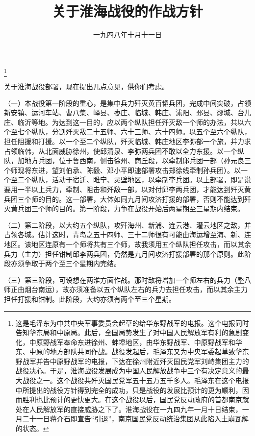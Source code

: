 
\title{关于淮海战役的作战方针}
\date{一九四八年十月十一日}
\thanks{这是毛泽东为中共中央军事委员会起草的给华东野战军的电报。这个电报同时告知华东局和中原局。此后，全国局势发生了对中国人民解放军有利的急剧变化，中原野战军奉命东进徐州、蚌埠地区，由华东野战军、中原野战军和华东、中原的地方部队共同作战。战役发起后，毛泽东又为中央军委起草致华东野战军并告中原野战军的电报，下达在徐州附近歼灭国民党军刘峙集团主力的战役决心。于是，淮海战役发展成为中国人民解放战争中三个有决定意义的最大战役之一。这个战役共歼灭国民党军五十五万五千多人。毛泽东在这个电报中所提出的战役方针得到完全的成功，只是战役的发展比预计的更为顺利，因而胜利也比预计的更快更大。在这个战役以后，国民党反动政府的首都南京就处在人民解放军的直接威胁之下了。淮海战役在一九四九年一月十日结束，一月二十一日蒋介石即宣告“引退”，南京国民党反动统治集团从此陷入土崩瓦解的状态。}
\maketitle


关于淮海战役部署，现在提出几点意见，供你们考虑。

（一）本战役第一阶段的重心，是集中兵力歼灭黄百韬兵团，完成中间突破，占领新安镇、运河车站、曹八集、峄县、枣庄、临城、韩庄、沭阳、邳县、郯城、台儿庄、临沂等地。为达到这一目的，应以两个纵队担任歼灭敌一个师的办法，共以六个至七个纵队，分割歼灭敌二十五师、六十三师、六十四师。以五个至六个纵队，担任阻援和打援。以一个至二个纵队，歼灭临城、韩庄地区李弥部一个旅，并力求占领临韩，从北面威胁徐州，使邱清泉、李弥两兵团不敢以全力东援。以一个纵队，加地方兵团，位于鲁西南，侧击徐州、商丘段，以牵制邱兵团一部（孙元良三个师现将东进，望刘伯承、陈毅、邓小平即速部署攻击郑徐线牵制孙兵团）。以一个至二个纵队，活动于宿迁、睢宁、灵壁地区，以牵制李兵团。以上部署，即是说要用一半以上兵力，牵制、阻击和歼敌一部，以对付邱李两兵团，才能达到歼灭黄兵团三个师的目的。这一部署，大体如同九月间攻济打援的部署，否则不能达到歼灭黄兵团三个师的目的。第一阶段，力争在战役开始后两星期至三星期内结束。

（二）第二阶段，以大约五个纵队，攻歼海州、新浦、连云港、灌云地区之敌，并占领各城。估计这时，青岛之五十四师、三十二师很有可能由海运增至海、新、连地区。该地区连原有一个师将共有三个师，故我须用五个纵队担任攻击，而以其余兵力（主力）担任钳制邱李两兵团，仍然是九月间攻济打援部署的那个原则。此阶段亦须争取于两个至三个星期内完结。

（三）第三阶段，可设想在两淮方面作战。那时敌将增加一个师左右的兵力（整八师正由烟台南运），故亦须准备以五个纵队左右的兵力去担任攻击，而以其余主力担任打援和钳制。此阶段，大约亦须有两个至三个星期。

